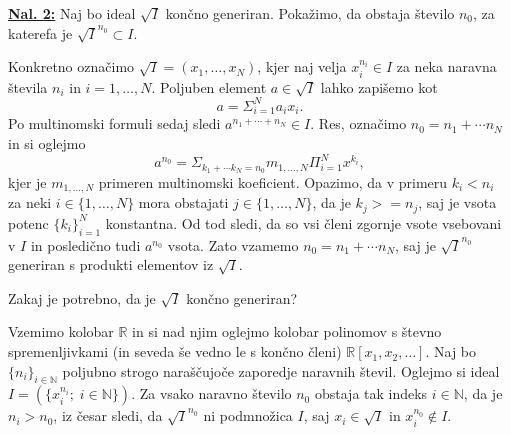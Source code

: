 \documentclass[a4paper, 12pt]{article} %
\newcommand{\N}{\mathbb{N}}
\newcommand{\R}{\mathbb{R}}
\begin{document}
\underline{\textbf{Nal. 2:}}
Naj bo ideal $\sqrt{I}$ končno generiran. Pokažimo, da obstaja število $n_0$, za katerefa je $\sqrt{I}^{n_0} \subset I$.

Konkretno označimo $\sqrt{I} = (x_1, \dots, x_N)$, kjer naj velja $x_i^{n_i} \in I$ za neka naravna števila $n_i$ in $i = 1,\dots,N$. Poljuben element $a \in \sqrt{I}$ lahko zapišemo kot
\[
a = \Sigma_{i = 1}^{N}a_ix_i.
\]
Po multinomski formuli sedaj sledi $a^{n_1 + \cdots + n_N} \in I$. Res, označimo $n_0 = n_1 + \cdots n_N$ in si oglejmo
\[
a^{n_0} = \Sigma_{k_1+\cdots k_N = n_0} m_{1,\dots,N}\Pi_{i=1}^N x^{k_i},
\]
kjer je $m_{1,\dots,N}$ primeren multinomski koeficient. Opazimo, da v primeru $k_i < n_i$ za neki $i \in \lbrace 1, \dots, N\rbrace$ mora obstajati $j \in \lbrace 1,\dots,N\rbrace$, da je $k_j >= n_j$, saj je vsota potenc $\lbrace k_i \rbrace_{i = 1}^N$ konstantna. Od tod sledi, da so vsi členi zgornje vsote vsebovani v $I$ in posledično tudi $a^{n_0}$ vsota. 
Zato vzamemo $n_0 = n_1 + \cdots n_N$, saj je $\sqrt{I}^{n_0}$ generiran s produkti elementov iz $\sqrt{I}$.

Zakaj je potrebno, da je $\sqrt{I}$ končno generiran?

Vzemimo kolobar $\R$ in si nad njim oglejmo kolobar polinomov s števno spremenljivkami (in seveda še vedno le s končno členi) $\R[x_1,x_2,\dots]$.
Naj bo $\lbrace n_i \rbrace_{i \in \N}$ poljubno strogo naraščujoče zaporedje naravnih števil. Oglejmo si ideal $I = (\lbrace x_i^{n_i} ; \; i \in \N\rbrace)$. Za vsako naravno število $n_0$ obstaja tak indeks $i \in \N$, da je $n_i > n_0$, iz česar sledi, da $\sqrt{I}^{n_0}$ ni podmnožica $I$, saj $x_i \in \sqrt{I}$ in $x_i^{n_0} \notin I$.
\newline
\end{document}
